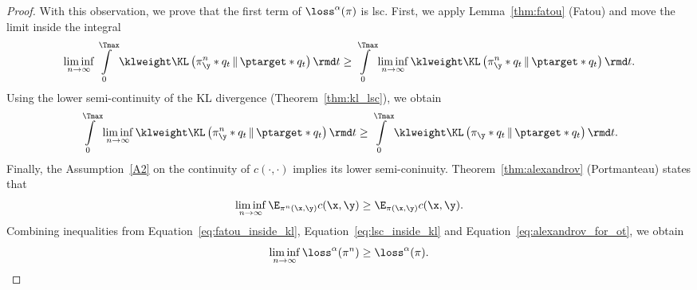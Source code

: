 \begin{proof}
    With this observation, we prove that the first term of $\loss^\alpha(\pi)$ is lsc. First, we apply Lemma~\ref{thm:fatou} (Fatou) and move the limit inside the integral
    \begin{equation}
    \label{eq:fatou_inside_kl}
        \liminf\limits_{n \rightarrow \infty}\int \limits_{0}^{\Tmax} \klweight \KL\left(\pi^n_{\y} * q_t \,\|\, \ptarget * q_t \right) \rmd t \geq \int \limits_{0}^{\Tmax} \liminf\limits_{n \rightarrow \infty}\klweight \KL\left(\pi^n_{\y} * q_t \,\|\, \ptarget * q_t \right) \rmd t.
    \end{equation}
    Using the lower semi-continuity of the KL divergence (Theorem~\ref{thm:kl_lsc}), we obtain
    \begin{equation}
    \label{eq:lsc_inside_kl}
        \int \limits_{0}^{\Tmax} \liminf\limits_{n \rightarrow \infty}\klweight \KL\left(\pi^n_{\y} * q_t \,\|\, \ptarget * q_t \right) \rmd t \geq \int\limits_{0}^{\Tmax} \klweight \KL \left(\pi_{\y} * q_t \,\|\, \ptarget * q_t\right) \rmd t.
    \end{equation}
    Finally, the Assumption~\ref{A2} on the continuity of $c(\cdot, \cdot)$ implies its lower semi-coninuity. Theorem~\ref{thm:alexandrov} (Portmanteau) states that 
    \begin{equation}
    \label{eq:alexandrov_for_ot}
        \liminf\limits_{n \rightarrow \infty} \E_{\pi^n(\x, \y)} c(\x, \y) \geq \E_{\pi(\x, \y)}c(\x, \y).
    \end{equation}
    Combining inequalities from Equation~\ref{eq:fatou_inside_kl}, Equation~\ref{eq:lsc_inside_kl} and Equation~\ref{eq:alexandrov_for_ot}, we obtain
    \begin{equation}
        \liminf\limits_{n \rightarrow \infty} \loss^\alpha(\pi^n) \geq \loss^\alpha(\pi).
    \end{equation}
\end{proof}
